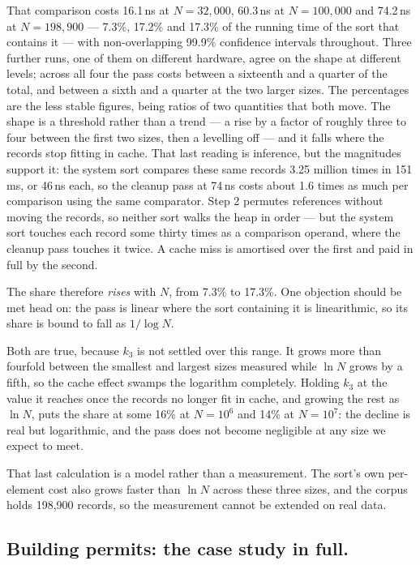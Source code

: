 \documentclass[twoside,leqno,twocolumn]{article}
\begin{document}
That comparison costs 16.1\,ns at $N = 32{,}000$, 60.3\,ns at $N = 100{,}000$ and 74.2\,ns at
$N = 198{,}900$ --- 7.3\%, 17.2\% and 17.3\% of the running time of the sort that contains it ---
with non-overlapping 99.9\% confidence intervals throughout.
Three further runs, one of them on different hardware, agree on the shape at different levels;
across all four the pass costs between a sixteenth and a quarter of the total,
and between a sixth and a quarter at the two larger sizes.
The percentages are the less stable figures, being ratios of two quantities that both move.
The shape is a threshold rather than a trend --- a rise by a factor of roughly three to four between the first two sizes,
then a levelling off --- and it falls where the records stop fitting in cache.
That last reading is inference, but the magnitudes support it:
the system sort compares these same records 3.25 million times in 151\,ms, or 46\,ns each,
so the cleanup pass at 74\,ns costs about 1.6 times as much per comparison using the same comparator.
Step 2 permutes references without moving the records, so neither sort walks the heap in order ---
but the system sort touches each record some thirty times as a comparison operand, where the cleanup
pass touches it twice.
A cache miss is amortised over the first and paid in full by the second.

The share therefore \emph{rises} with $N$, from 7.3\% to 17.3\%.
One objection should be met head on: the pass is linear where the sort containing it is linearithmic,
so its share is bound to fall as $1/\log N$.

Both are true, because $k_3$ is not settled over this range.
It grows more than fourfold between the smallest and largest sizes measured while $\ln N$ grows by a
fifth, so the cache effect swamps the logarithm completely.
Holding $k_3$ at the value it reaches once the records no longer fit in cache, and growing the rest as
$\ln N$, puts the share at some 16\% at $N = 10^{6}$ and 14\% at $N = 10^{7}$:
the decline is real but logarithmic, and the pass does not become negligible at any size we expect to meet.

That last calculation is a model rather than a measurement.
The sort's own per-element cost also grows faster than $\ln N$ across these three sizes,
and the corpus holds 198,900 records, so the measurement cannot be extended on real data.

\subsection{Building permits: the case study in full.}
\label{sec:permits}
\end{document}
